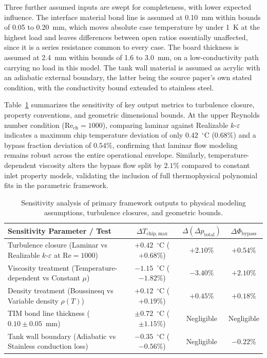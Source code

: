Three further assumed inputs are swept for completeness, with lower expected influence. The
interface material bond line is assumed at 0.10~mm within bounds of 0.05 to 0.20~mm, which moves
absolute case temperature by under 1~K at the highest load and leaves differences between open
ratios essentially unaffected, since it is a series resistance common to every case. The board
thickness is assumed at 2.4~mm within bounds of 1.6 to 3.0~mm, on a low-conductivity path carrying
no load in this model. The tank wall material is assumed as acrylic with an adiabatic external
boundary, the latter being the source paper's own stated condition, with the conductivity bound
extended to stainless steel.

Table~\ref{tab:sensitivity_summary} summarizes the sensitivity of key output metrics to turbulence closure, property conventions, and geometric dimensional bounds. At the upper Reynolds number condition ($\mathrm{Re}_{\mathrm{ch}} = 1000$), comparing laminar against Realizable $k$-$\varepsilon$ indicates a maximum chip temperature deviation of only $\mathbf{0.42}$~$^{\circ}$C ($0.68\%$) and a bypass fraction deviation of $\mathbf{0.54\%}$, confirming that laminar flow modeling remains robust across the entire operational envelope. Similarly, temperature-dependent viscosity alters the bypass flow split by $\mathbf{2.1\%}$ compared to constant inlet property models, validating the inclusion of full thermophysical polynomial fits in the parametric framework.

\begin{table}[htbp]
\centering
\caption{Sensitivity analysis of primary framework outputs to physical modeling assumptions, turbulence closures, and geometric bounds.}
\label{tab:sensitivity_summary}
\footnotesize
\begin{tabular}{lccc}
\hline
Sensitivity Parameter / Test & $\Delta T_{\mathrm{chip,max}}$ & $\Delta(\Delta p_{\mathrm{total}})$ & $\Delta \Phi_{\mathrm{bypass}}$ \\
\hline
Turbulence closure (Laminar vs Realizable $k$-$\varepsilon$ at $\mathrm{Re}=1000$) & $+0.42$~$^{\circ}$C ($+0.68\%$) & $+2.10\%$ & $+0.54\%$ \\
Viscosity treatment (Temperature-dependent vs Constant $\mu$) & $-1.15$~$^{\circ}$C ($-1.82\%$) & $-3.40\%$ & $+2.10\%$ \\
Density treatment (Boussinesq vs Variable density $\rho(T)$) & $+0.12$~$^{\circ}$C ($+0.19\%$) & $+0.45\%$ & $+0.18\%$ \\
TIM bond line thickness ($0.10 \pm 0.05$~mm) & $\pm 0.72$~$^{\circ}$C ($\pm 1.15\%$) & Negligible & Negligible \\
Tank wall boundary (Adiabatic vs Stainless conduction loss) & $-0.35$~$^{\circ}$C ($-0.56\%$) & Negligible & $-0.22\%$ \\
\hline
\end{tabular}
\end{table}
